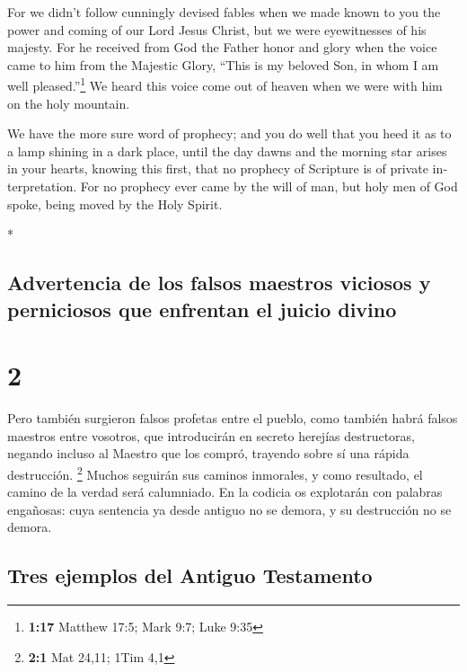 \begin{paracol}{2}
\begin{otherlanguage}{english}
 For we didn't follow cunningly devised fables when we
made known to you the power and coming of our Lord Jesus Christ, but we
were eyewitnesses of his majesty.  For he received from
God the Father honor and glory when the voice came to him from the
Majestic Glory, ``This is my beloved Son, in whom I am well
pleased.''\footnote{\textbf{1:17} Matthew 17:5; Mark 9:7; Luke 9:35}
 We heard this voice come out of heaven when we were with
him on the holy mountain.

 We have the more sure word of prophecy; and you do well
that you heed it as to a lamp shining in a dark place, until the day
dawns and the morning star arises in your hearts, 
knowing this first, that no prophecy of Scripture is of private
interpretation.  For no prophecy ever came by the will of
man, but holy men of God spoke, being moved by the Holy Spirit.

\end{otherlanguage}

\switchcolumn[0]*

\hypertarget{advertencia-de-los-falsos-maestros-viciosos-y-perniciosos-que-enfrentan-el-juicio-divino}{%
\subsection{Advertencia de los falsos maestros viciosos y perniciosos
que enfrentan el juicio
divino}\label{advertencia-de-los-falsos-maestros-viciosos-y-perniciosos-que-enfrentan-el-juicio-divino}}

\hypertarget{section-2}{%
\section{2}\label{section-2}}

 Pero también surgieron falsos profetas entre el pueblo,
como también habrá falsos maestros entre vosotros, que introducirán en
secreto herejías destructoras, negando incluso al Maestro que los
compró, trayendo sobre sí una rápida destrucción. \footnote{\textbf{2:1}
  Mat 24,11; 1Tim 4,1}  Muchos seguirán sus caminos
inmorales, y como resultado, el camino de la verdad será calumniado.
 En la codicia os explotarán con palabras engañosas: cuya
sentencia ya desde antiguo no se demora, y su destrucción no se demora.

\hypertarget{tres-ejemplos-del-antiguo-testamento}{%
\subsection{Tres ejemplos del Antiguo
Testamento}\label{tres-ejemplos-del-antiguo-testamento}}


\end{paracol}
